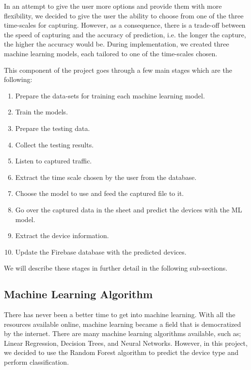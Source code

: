\documentclass{article}
\begin{document}
In an attempt to give the user more options and provide them with more flexibility, we decided to give the user the ability to choose from one of the three time-scales for capturing. However, as a consequence, there is a trade-off between the speed of capturing and the accuracy of prediction, i.e. the longer the capture, the higher the accuracy would be. During implementation, we created three machine learning models, each tailored to one of the time-scales chosen.\newline

This component of the project goes through a few main stages which are the following:
\begin{enumerate}
    \item Prepare the data-sets for training each machine learning model.
    \item Train the models.
    \item Prepare the testing data.
    \item Collect the testing results.
    \item Listen to captured traffic.
    \item Extract the time scale chosen by the user from the database.
    \item Choose the model to use and feed the captured file to it.
    \item Go over the captured data in the sheet and predict the devices with the ML model.
    \item Extract the device information. 
    \item Update the Firebase database with the predicted devices.\newline
\end{enumerate}

We will describe these stages in further detail in the following sub-sections. 

\subsection{Machine Learning Algorithm}
There has never been a better time to get into machine learning. With all the resources available online, machine learning became a field that is democratized by the internet. There are many machine learning algorithms available, such as; Linear Regression, Decision Trees, and Neural Networks. However, in this project, we decided to use the Random Forest algorithm to predict the device type and perform classification. \newline
\end{document}
